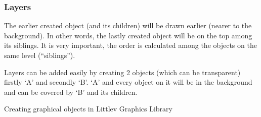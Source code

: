 \documentclass[letterpaper,10pt,english]{sphinxmanual}
\begin{document}
\subsubsection{Layers}
\label{\detokenize{overview/objects:layers}}
The earlier created object (and its children) will be drawn earlier (nearer to the background). In other words, the lastly created object will be on the top among its siblings. It is very important, the order is calculated among the objects on the same level (“siblings”).

Layers can be added easily by creating 2 objects (which can be transparent) firstly ‘A’ and secondly ‘B’. ‘A’ and every object on it will be in the background and can be covered by ‘B’ and its children.

Creating graphical objects in Littlev Graphics Library
\end{document}
